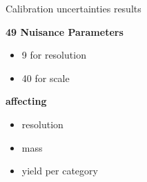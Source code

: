 \begin{frame}{Calibration uncertainties results}

  \begin{minipage}{0.49\linewidth}
    \centering
    {\bf 49 Nuisance Parameters }
    \begin{itemize}
    \item 9 for resolution
    \item 40 for scale
    \end{itemize}
    \vfill
    {\bf affecting }
    \begin{itemize}
    \item resolution
    \item mass
    \item yield per category
      \end{itemize}
  \end{minipage}
  \hfill
  \begin{minipage}{0.49\linewidth}
  \end{minipage}


\end{frame}
